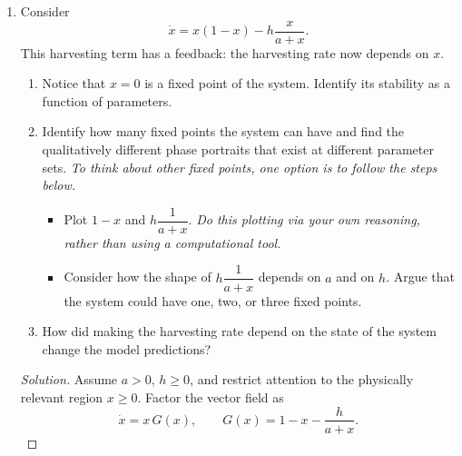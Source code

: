 \documentclass[12pt]{amsart}
\theoremstyle{conjecture}
\theoremstyle{definition}
\theoremstyle{question}
\theoremstyle{theorem}
\newenvironment{solution}
{\begin{proof}[Solution]}
{\end{proof}}
\begin{document}
\begin{enumerate}
\begin{solution}
\begin{enumerate}[label=(\alph*)]
    At $h=h_c$, the equilibrium $x=1/2$ is semistable: solutions starting above it approach it,
    while solutions starting below it decrease away from it. For $h>h_c$, $F(x)<0$ for every $x$,
    so every nonnegative initial population decreases, reaches extinction, and then becomes negative
    in the unphysical continuation of the model. Thus harvesting above $h_c$ predicts collapse of the
    fishery, whereas harvesting below $h_c$ permits a stable positive population only if the initial
    population lies above the threshold $x_-$.
            \end{enumerate}
        \end{solution}

        \item Consider
        \[
            \dot{x}=x(1-x)-h\frac{x}{a+x}.
        \]
        This harvesting term has a feedback: the harvesting rate now depends on $x$.

        \begin{enumerate}[label=(\alph*)]
            \item Notice that $x=0$ is a fixed point of the system. Identify its stability as a function of parameters.
            \item Identify how many fixed points the system can have and find the qualitatively different phase
            portraits that exist at different parameter sets. \emph{To think about other fixed points, one option is
            to follow the steps below.}
            \begin{itemize}
                \item Plot $1-x$ and $h\dfrac{1}{a+x}$. \emph{Do this plotting via your own reasoning, rather
                than using a computational tool.}
                \item Consider how the shape of $h\dfrac{1}{a+x}$ depends on $a$ and on $h$. Argue that the
                system could have one, two, or three fixed points.
            \end{itemize}
            \item How did making the harvesting rate depend on the state of the system change the model predictions?
        \end{enumerate}
        \begin{solution}
            Assume $a>0$, $h\ge0$, and restrict attention to the physically relevant region $x\ge0$. Factor
            the vector field as
            \[
                \dot{x}=x\,G(x),
                \qquad
                G(x)=1-x-\frac{h}{a+x}.
            \]


\end{solution}
\end{enumerate}
\end{document}
